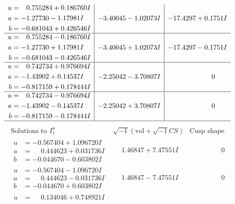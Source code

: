 \documentclass[1p]{elsarticle_modified}
\theoremstyle{definition}
\newcommand{\I}{\sqrt{-1}}
\begin{document}
$$\begin{array}{c|c|c}
\begin{aligned}
u &= \phantom{-}0.755284 + 0.186760 I \\
a &= -1.27730 - 1.17981 I \\
b &= -0.681043 + 0.426546 I\end{aligned}
 & -3.40045 - 1.02073 I & -17.4297 + 0.1751 I \\ \hline\begin{aligned}
u &= \phantom{-}0.755284 - 0.186760 I \\
a &= -1.27730 + 1.17981 I \\
b &= -0.681043 - 0.426546 I\end{aligned}
 & -3.40045 + 1.02073 I & -17.4297 - 0.1751 I \\ \hline\begin{aligned}
u &= \phantom{-}0.742734 + 0.976694 I \\
a &= -1.43902 + 0.14537 I \\
b &= -0.817159 + 0.178444 I\end{aligned}
 & -2.25042 - 3.70807 I & \phantom{-0.000000 } 0 \\ \hline\begin{aligned}
u &= \phantom{-}0.742734 - 0.976694 I \\
a &= -1.43902 - 0.14537 I \\
b &= -0.817159 - 0.178444 I\end{aligned}
 & -2.25042 + 3.70807 I & \phantom{-0.000000 } 0\\
 \hline 
 \end{array}$$\newpage$$\begin{array}{c|c|c}  
\text{Solutions to }I^u_{1}& \I (\text{vol} + \sqrt{-1}CS) & \text{Cusp shape}\\
 \hline 
\begin{aligned}
u &= -0.567404 + 1.096720 I \\
a &= \phantom{-}0.444623 + 0.031736 I \\
b &= -0.044670 - 0.603802 I\end{aligned}
 & \phantom{-}1.46847 + 7.47551 I & \phantom{-0.000000 } 0 \\ \hline\begin{aligned}
u &= -0.567404 - 1.096720 I \\
a &= \phantom{-}0.444623 - 0.031736 I \\
b &= -0.044670 + 0.603802 I\end{aligned}
 & \phantom{-}1.46847 - 7.47551 I & \phantom{-0.000000 } 0 \\ \hline\begin{aligned}
u &= \phantom{-}0.134046 + 0.748921 I \\

\end{aligned}
\end{array}$$
\end{document}
